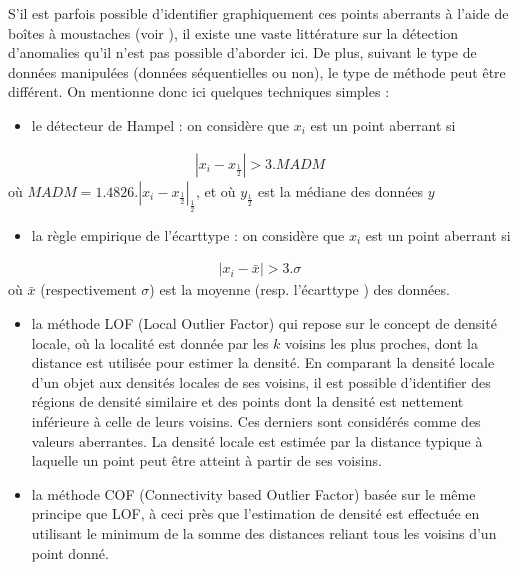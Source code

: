 \documentclass[letterpaper,10pt,english]{jupyterBook}
\begin{document}
\sphinxAtStartPar
S’il est parfois possible d’identifier graphiquement ces points aberrants à l’aide de boîtes à moustaches (voir {\hyperref[\detokenize{statsdescriptives:boxplot}]{}}), il existe une vaste littérature sur la détection d’anomalies qu’il n’est pas possible d’aborder ici. De plus, suivant le type de données manipulées (données séquentielles ou non), le type de méthode peut être différent. On mentionne donc ici quelques techniques simples :
\begin{itemize}
\item {} 
\sphinxAtStartPar
le détecteur de Hampel : on considère que \(x_i\) est un point aberrant si

\end{itemize}
\begin{equation*}
\begin{split}|x_i-x_{\frac12}|>3.MADM\end{split}
\end{equation*}
\sphinxAtStartPar
où \(MADM = 1.4826.|x_i-x_{\frac12}|_\frac12\), et où \(y_{\frac12}\) est la médiane des données \(y\)
\begin{itemize}
\item {} 
\sphinxAtStartPar
la règle empirique de l’écart\sphinxhyphen{}type : on considère que \(x_i\) est un point aberrant si

\end{itemize}
\begin{equation*}
\begin{split}|x_i-\bar x|>3.\sigma\end{split}
\end{equation*}
\sphinxAtStartPar
où  \(\bar x\) (respectivement \(\sigma\)) est la moyenne (resp. l’écart\sphinxhyphen{}type ) des données.
\begin{itemize}
\item {} 
\sphinxAtStartPar
la méthode LOF (Local Outlier Factor) qui repose sur le concept de densité locale, où la localité est donnée par les \(k\) voisins les plus proches, dont la distance est utilisée pour estimer la densité. En comparant la densité locale d’un objet aux densités locales de ses voisins, il est possible d’identifier des régions de densité similaire et des points dont la densité est nettement inférieure à celle de leurs voisins. Ces derniers sont considérés comme des valeurs aberrantes. La densité locale est estimée par la distance typique à laquelle un point peut être atteint à partir de ses voisins.

\item {} 
\sphinxAtStartPar
la méthode COF (Connectivity based Outlier Factor) basée sur le même principe que LOF, à ceci près que l’estimation de densité est effectuée en utilisant le minimum de la somme des distances reliant tous les voisins d’un point donné.

\end{itemize}
\end{document}
